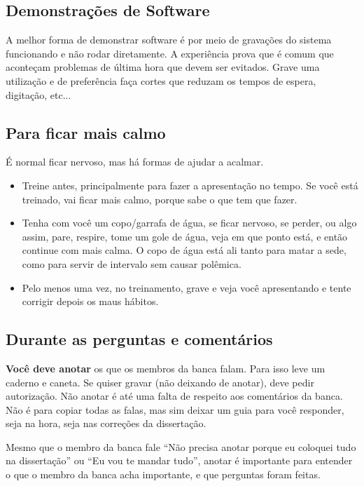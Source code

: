 \documentclass[a4paper,12pt]{article}
\begin{document}
\subsection{Demonstrações de Software}

A melhor forma de demonstrar software é por meio de gravações do sistema funcionando e não rodar diretamente. A experiência prova que é comum que aconteçam problemas de última hora que devem ser evitados. Grave uma utilização e de preferência faça cortes que reduzam os tempos de espera, digitação, etc...

\subsection{Para ficar mais calmo}

É normal ficar nervoso, mas há formas de ajudar a acalmar.
\begin{itemize}
    \item Treine antes, principalmente para fazer a apresentação no tempo. Se você está treinado, vai ficar mais calmo, porque sabe o que tem que fazer.
    \item Tenha com você um copo/garrafa de água, se ficar nervoso, se perder, ou algo assim, pare, respire, tome um gole de água, veja em que ponto está, e então continue com mais calma. O copo de água está ali tanto para matar a sede, como para servir de intervalo sem causar polêmica.
    \item Pelo menos uma vez, no treinamento, grave e veja você apresentando e tente corrigir depois os maus hábitos.
\end{itemize}

\subsection{Durante as perguntas e comentários}

\textbf{Você deve anotar} os que os membros da banca falam. Para isso leve um caderno e caneta. Se quiser gravar (não deixando de anotar), deve pedir autorização. Não anotar é até uma falta de respeito aos comentários da banca. Não é para copiar todas as falas, mas sim deixar um guia para você responder, seja na hora, seja nas correções da dissertação.

Mesmo que o membro da banca fale ``Não precisa anotar porque eu coloquei tudo na dissertação'' ou ``Eu vou te mandar tudo'', anotar é importante para entender o que o membro da banca acha importante, e que perguntas foram feitas.
\end{document}

